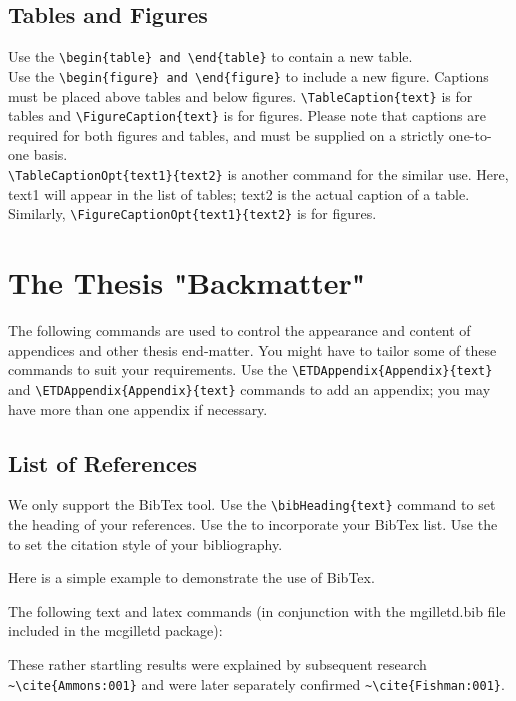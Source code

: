 \documentclass[12pt,Bold,letterpaper,TexShade]{mcgilletdclass}
\begin{document}
\section{Tables and Figures}
Use the \verb=\begin{table} and \end{table}= to contain a new table.\\
Use the \verb=\begin{figure} and \end{figure}= to include a new figure.
Captions must be placed above
tables and below figures. \verb=\TableCaption{text}= is for tables and 
\verb=\FigureCaption{text}= is for figures.  Please note that captions
are required for both figures and tables, and must be supplied on a 
strictly one-to-one basis. \\

\verb=\TableCaptionOpt{text1}{text2}= is another command for the similar use.
Here, text1 will appear in the list of tables; text2 is the actual caption of
a table. Similarly, \verb=\FigureCaptionOpt{text1}{text2}= is for figures. \\



\chapter{The Thesis "Backmatter"}
The following commands are used to control the appearance and content
of appendices and other thesis end-matter.
You might have to tailor some of these commands to suit your 
requirements.
Use the \verb=\ETDAppendix{Appendix}{text}=
and \verb=\ETDAppendix{Appendix}{text}=
commands to add an appendix; you may have more than one appendix if 
necessary.

\section{List of References}
We only support the BibTex tool.
Use the \verb=\bibHeading{text}= command to set the heading of your references.
Use the \verb== to incorporate your BibTex list.
Use the \verb== to set the citation style of your
bibliography.

Here is a simple example to demonstrate the use of BibTex.

The following text and latex commands (in conjunction with the mgilletd.bib
file included in the mcgilletd package):

These rather startling results were explained by subsequent 
research \verb=~\cite{Ammons:001}= and were later separately confirmed \verb=~\cite{Fishman:001}=.
\end{document}
